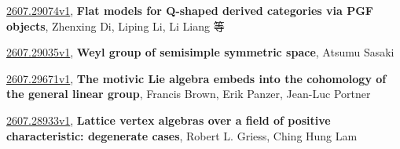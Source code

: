 \documentclass[9pt, a4paper]{article}
\theoremstyle{plain}
\theoremstyle{definition}
\theoremstyle{remark}
\newcommand{\arxiv}[3]{\href{https://arxiv.org/abs/#1}{#1}, \textbf{\textcolor{arxivblue}{#2}}, #3}
\begin{document}
\arxiv{2607.29074v1}{Flat models for Q-shaped derived categories via PGF objects}{Zhenxing Di, Liping Li, Li Liang 等}

\arxiv{2607.29035v1}{Weyl group of semisimple symmetric space}{Atsumu Sasaki}

\arxiv{2607.29671v1}{The motivic Lie algebra embeds into the cohomology of the general linear group}{Francis Brown, Erik Panzer, Jean-Luc Portner}

\arxiv{2607.28933v1}{Lattice vertex algebras over a field of positive characteristic: degenerate cases}{Robert L. Griess, Ching Hung Lam}

\end{document}

